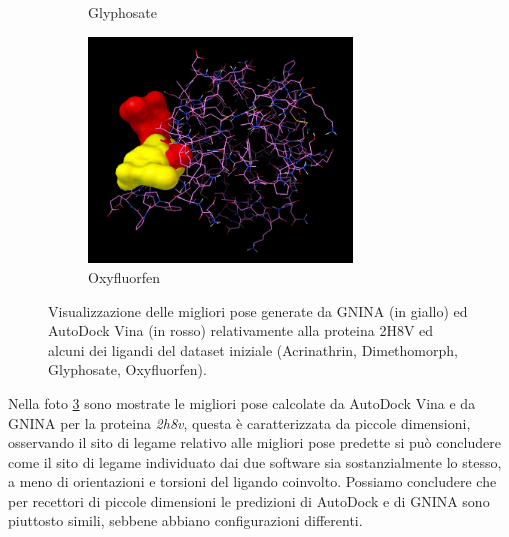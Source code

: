 \begin{figure}[H]
\begin{subfigure}[b]{0.475\textwidth}
        \caption[]%
        {{\small Glyphosate}}    
        \label{fig:2h8v_glyphosate}
    \end{subfigure}
    \hfill
    \begin{subfigure}[b]{0.475\textwidth}   
        \centering 
        \includegraphics[width=\textwidth, height=6cm]{immagini/capitolo4/2h8v_oxyfluorfen.jpg}
        \caption[]%
        {{\small Oxyfluorfen}}    
        \label{fig:2h8v_oxyfluorfen}
    \end{subfigure}
    \caption[Conformazioni proteina-ligando per la proteina 2H8V]
    {\small Visualizzazione delle migliori pose generate da GNINA (in giallo) ed AutoDock Vina (in rosso) relativamente alla proteina 2H8V ed alcuni dei ligandi del dataset iniziale (Acrinathrin, Dimethomorph, Glyphosate, Oxyfluorfen).} 
    \label{fig:2h8v}
\end{figure}

Nella foto \ref{fig:2h8v} sono mostrate le migliori pose calcolate da AutoDock Vina e da GNINA per la proteina \textit{2h8v}, questa è caratterizzata da piccole dimensioni, osservando il sito di legame relativo alle migliori pose predette si può concludere come il sito di legame individuato dai due software sia sostanzialmente lo stesso, a meno di orientazioni e torsioni del ligando coinvolto. Possiamo concludere che per recettori di piccole dimensioni le predizioni di AutoDock e di GNINA sono piuttosto simili, sebbene abbiano configurazioni differenti.


